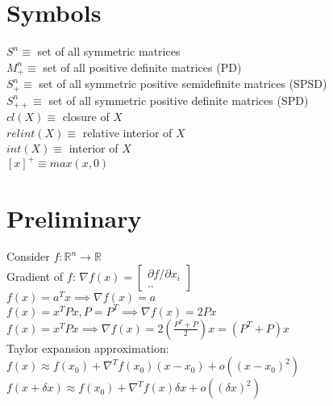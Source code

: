 \documentclass[8pt]{report}
\newcommand{\R}{\mathbb{R}}
\begin{document}

\begin{multicols*}{2}

  \section{Symbols}

  $S^n \equiv$ set of all symmetric matrices\\
  
  $M_+^n \equiv$ set of all positive definite matrices (PD)\\
  
  $S_+^n \equiv$ set of all symmetric positive semidefinite matrices (SPSD)\\
  
  $S_{++}^n \equiv$ set of all symmetric positive definite matrices (SPD)\\
  
  $cl(X) \equiv$ closure of $X$\\

  $relint(X) \equiv$ relative interior of $X$\\
  
  $int(X) \equiv$ interior of $X$\\

  $[x]^+ \equiv max(x,0)$
  
  \vfill\null
  \columnbreak
  \vfill\null
  \columnbreak
  
  \section{Preliminary}
  
  Consider $f:\R^n \to \R$\\
  Gradient of $f$: $\nabla f(x) = \begin{bmatrix} \partial f / \partial x_i \\ .. \end{bmatrix}$\\
  $f(x) = a^Tx \implies \nabla f(x) = a$\\
  $f(x) = x^TPx, P=P^T \implies \nabla f(x) = 2Px$\\
  $f(x) = x^TPx \implies \nabla f(x) = 2(\frac{P^T+P}{2})x=(P^T+P)x$\\

  Taylor expansion approximation:\\
  $f(x) \approx f(x_0) + \nabla^T f(x_0)(x-x_0) + o((x-x_0)^2)$\\
  $f(x+\delta x) \approx f(x_0) + \nabla^T f(x)\delta x + o((\delta x)^2)$\\
  

\end{multicols*}
\end{document}
